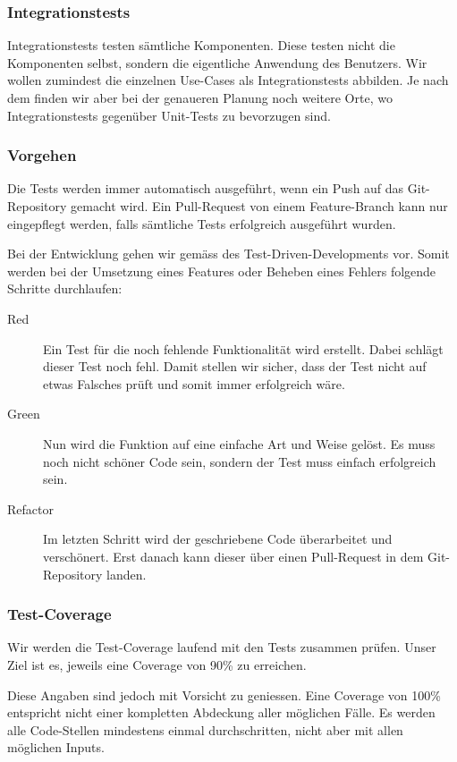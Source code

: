 \documentclass[a4paper]{article}
\begin{document}
\subsubsection{Integrationstests}

Integrationstests testen sämtliche Komponenten. Diese testen nicht die Komponenten selbst, sondern die eigentliche Anwendung des Benutzers.
Wir wollen zumindest die einzelnen Use-Cases als Integrationstests abbilden. Je nach dem finden wir aber bei der genaueren Planung noch weitere Orte, wo Integrationstests gegenüber Unit-Tests zu bevorzugen sind.

\subsubsection{Vorgehen}

Die Tests werden immer automatisch ausgeführt, wenn ein Push auf das Git-Repository gemacht wird.
Ein Pull-Request von einem Feature-Branch kann nur eingepflegt werden, falls sämtliche Tests erfolgreich ausgeführt wurden.

Bei der Entwicklung gehen wir gemäss des Test-Driven-Developments vor.
Somit werden bei der Umsetzung eines Features oder Beheben eines Fehlers folgende Schritte durchlaufen:

\begin{description}
  \item[Red]
    Ein Test für die noch fehlende Funktionalität wird erstellt.
    Dabei schlägt dieser Test noch fehl.
    Damit stellen wir sicher, dass der Test nicht auf etwas Falsches prüft und somit immer erfolgreich wäre.
  \item[Green]
    Nun wird die Funktion auf eine einfache Art und Weise gelöst.
    Es muss noch nicht schöner Code sein, sondern der Test muss einfach erfolgreich sein.
  \item[Refactor]
    Im letzten Schritt wird der geschriebene Code überarbeitet und verschönert.
    Erst danach kann dieser über einen Pull-Request in dem Git-Repository landen.
\end{description}

\subsubsection{Test-Coverage}

Wir werden die Test-Coverage laufend mit den Tests zusammen prüfen.
Unser Ziel ist es, jeweils eine Coverage von 90\% zu erreichen.

Diese Angaben sind jedoch mit Vorsicht zu geniessen.
Eine Coverage von 100\% entspricht nicht einer kompletten Abdeckung aller möglichen Fälle.
Es werden alle Code-Stellen mindestens einmal durchschritten, nicht aber mit allen möglichen Inputs.
\end{document}
